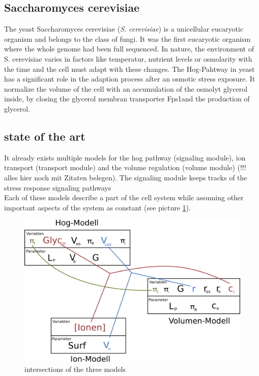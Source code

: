 \subsection{Saccharomyces cerevisiae}
The yeast Saccharomyces cerevisiae (\emph{S. cerevisiae}) is a unicellular eucaryotic organism and belongs to the class of fungi. It was the first eucaryotic organism where the whole genome had been full sequenced. %
In nature, the environment of S. cerevisiae varies in factors like temperatur, nutrient levels or osmolarity with the time and the cell must adapt with these changes. The Hog-Pahtway in yeast has a significant role in the adaption process after an osmotic stress exposure. It normalize the volume of the cell with an accumulation of the osmolyt glycerol inside, by closing the glycerol membran transporter Fps1and the production of glycerol.  \\

\subsection{state of the art}
It already exists multiple models for the hog pathway (signaling module), ion transport (transport module) and the volume regulation (volume module) (!!! alles hier noch mit Zitaten belegen). The signaling module keeps tracks of the stress response signaling pathways \\
Each of these models describe a part of the cell system while assuming other important aspects of the system as constant (see picture \ref{IntersectionsOfTheModels}).

\begin{figure}[h!]
	\begin{center}
		\begin{minipage}{0,8\textwidth}
			
			\includegraphics[width=\textwidth]{picture/model_intersections.png}
			\caption{intersections of the three models } 
			\label{IntersectionsOfTheModels} 
		\end{minipage}
	\end{center}
\end{figure}

